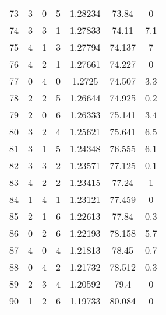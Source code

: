 \documentclass[11pt]{article}
\begin{document}
\begin{table}[htbp]
\begin{tabular}{ccccccc}
			73 & 3 & 0 & 5 & 1.28234 & 73.84 & 0 \\
			74 & 3 & 3 & 1 & 1.27833 & 74.11 & 7.1 \\
			75 & 4 & 1 & 3 & 1.27794 & 74.137 & 7 \\
			76 & 4 & 2 & 1 & 1.27661 & 74.227 & 0 \\
			77 & 0 & 4 & 0 & 1.2725 & 74.507 & 3.3 \\
			78 & 2 & 2 & 5 & 1.26644 & 74.925 & 0.2 \\
			79 & 2 & 0 & 6 & 1.26333 & 75.141 & 3.4 \\
			80 & 3 & 2 & 4 & 1.25621 & 75.641 & 6.5 \\
			81 & 3 & 1 & 5 & 1.24348 & 76.555 & 6.1 \\
			82 & 3 & 3 & 2 & 1.23571 & 77.125 & 0.1 \\
			83 & 4 & 2 & 2 & 1.23415 & 77.24 & 1 \\
			84 & 1 & 4 & 1 & 1.23121 & 77.459 & 0 \\
			85 & 2 & 1 & 6 & 1.22613 & 77.84 & 0.3 \\
			86 & 0 & 2 & 6 & 1.22193 & 78.158 & 5.7 \\
			87 & 4 & 0 & 4 & 1.21813 & 78.45 & 0.7 \\
			88 & 0 & 4 & 2 & 1.21732 & 78.512 & 0.3 \\
			89 & 2 & 3 & 4 & 1.20592 & 79.4 & 0 \\
			90 & 1 & 2 & 6 & 1.19733 & 80.084 & 0 \\
			\bottomrule
		\end{tabular}%
		\label{tab:SrCO3_Peaks_2}%
	\end{table}%
	
\end{document}

